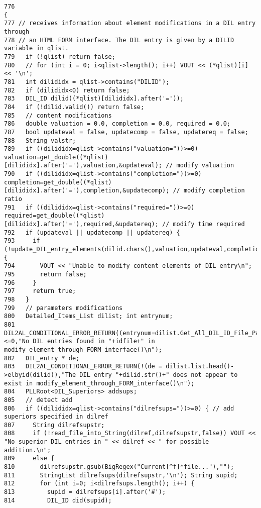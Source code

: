 \footnotesize\begin{verbatim}776                                                                       {
777 // receives information about element modifications in a DIL entry through
778 // an HTML FORM interface. The DIL entry is given by a DILID variable in qlist.
779   if (!qlist) return false;
780   // for (int i = 0; i<qlist->length(); i++) VOUT << (*qlist)[i] << '\n';
781   int dilididx = qlist->contains("DILID");
782   if (dilididx<0) return false;
783   DIL_ID dilid((*qlist)[dilididx].after('='));
784   if (!dilid.valid()) return false;
785   // content modifications
786   double valuation = 0.0, completion = 0.0, required = 0.0;
787   bool updateval = false, updatecomp = false, updatereq = false;
788   String valstr;
789   if ((dilididx=qlist->contains("valuation="))>=0) valuation=get_double((*qlist)[dilididx].after('='),valuation,&updateval); // modify valuation
790   if ((dilididx=qlist->contains("completion="))>=0) completion=get_double((*qlist)[dilididx].after('='),completion,&updatecomp); // modify completion ratio
791   if ((dilididx=qlist->contains("required="))>=0) required=get_double((*qlist)[dilididx].after('='),required,&updatereq); // modify time required
792   if (updateval || updatecomp || updatereq) {
793     if (!update_DIL_entry_elements(dilid.chars(),valuation,updateval,completion,updatecomp,required,updatereq)) {
794       VOUT << "Unable to modify content elements of DIL entry\n";
795       return false;
796     }
797     return true;
798   }
799   // parameters modifications
800   Detailed_Items_List dilist; int entrynum;
801   DIL2AL_CONDITIONAL_ERROR_RETURN((entrynum=dilist.Get_All_DIL_ID_File_Parameters())<=0,"No DIL entries found in "+idfile+" in modify_element_through_FORM_interface()\n");
802   DIL_entry * de;
803   DIL2AL_CONDITIONAL_ERROR_RETURN(!(de = dilist.list.head()->elbyid(dilid)),"The DIL entry "+dilid.str()+" does not appear to exist in modify_element_through_FORM_interface()\n");
804   PLLRoot<DIL_Superiors> addsups;
805   // detect add
806   if ((dilididx=qlist->contains("dilrefsups="))>=0) { // add superiors specified in dilref
807     String dilrefsupstr;
808     if (!read_file_into_String(dilref,dilrefsupstr,false)) VOUT << "No superior DIL entries in " << dilref << " for possible addition.\n";
809     else {
810       dilrefsupstr.gsub(BigRegex("Current[^f]*file..."),"");
811       StringList dilrefsups(dilrefsupstr,'\n'); String supid;
812       for (int i=0; i<dilrefsups.length(); i++) {
813         supid = dilrefsups[i].after('#');
814         DIL_ID did(supid);

\end{verbatim}
